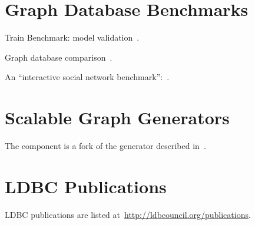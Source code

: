 \section{Graph Database Benchmarks}

Train Benchmark: model validation~\cite{TrainBenchmarkSOSYM}.

Graph database comparison~\cite{lissandrini17}.

An ``interactive social network benchmark'':~\cite{DBLP:conf/cidr/BarahmandG13}.

\section{Scalable Graph Generators}

The \datagen component is a fork of the generator described in~\cite{DBLP:conf/tpctc/PhamBE12}.


\section{LDBC Publications}

LDBC publications are listed at~\url{http://ldbcouncil.org/publications}.
